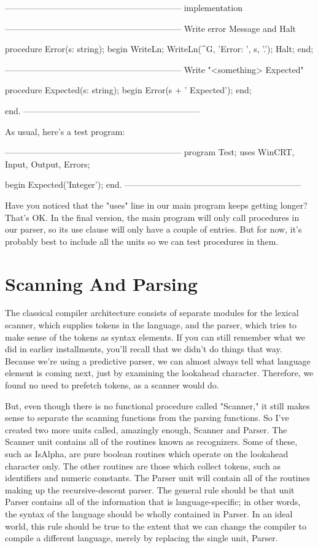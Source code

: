 \documentclass[float=false, crop=false]{standalone}
\begin{document}
{--------------------------------------------------------------}
implementation

{--------------------------------------------------------------}
{ Write error Message and Halt }

procedure Error(s: string);
begin
	WriteLn;
	WriteLn(^G, 'Error: ', s, '.');
	Halt;
end;

{--------------------------------------------------------------}
{ Write "<something> Expected" }

procedure Expected(s: string);
begin
	Error(s + ' Expected');
end;

end.
{--------------------------------------------------------------}


As usual, here's a test program:




{--------------------------------------------------------------}
program Test;
uses WinCRT, Input, Output, Errors;

begin
	Expected('Integer');
end.
{--------------------------------------------------------------}

Have you noticed that the "uses" line in our main program keeps getting longer?
That's OK. In the final version, the main program will only call procedures in
our parser, so its use clause will only have a couple of entries. But for now,
it's probably best to include all the units so we can test procedures in them.


\section{Scanning And Parsing}

The classical compiler architecture consists of separate modules for the lexical
scanner, which supplies tokens in the language, and the parser, which tries to
make sense of the tokens as syntax elements. If you can still remember what we
did in earlier installments, you'll recall that we didn't do things that way.
Because we're using a predictive parser, we can almost always tell what language
element is coming next, just by examining the lookahead character. Therefore, we
found no need to prefetch tokens, as a scanner would do.

But, even though there is no functional procedure called "Scanner," it still
makes sense to separate the scanning functions from the parsing functions. So
I've created two more units called, amazingly enough, Scanner and Parser. The
Scanner unit contains all of the routines known as recognizers. Some of these,
such as IsAlpha, are pure boolean routines which operate on the lookahead
character only. The other routines are those which collect tokens, such as
identifiers and numeric constants. The Parser unit will contain all of the
routines making up the recursive-descent parser. The general rule should be that
unit Parser contains all of the information that is language-specific; in other
words, the syntax of the language should be wholly contained in Parser. In an
ideal world, this rule should be true to the extent that we can change the
compiler to compile a different language, merely by replacing the single unit,
Parser.
\end{document}

